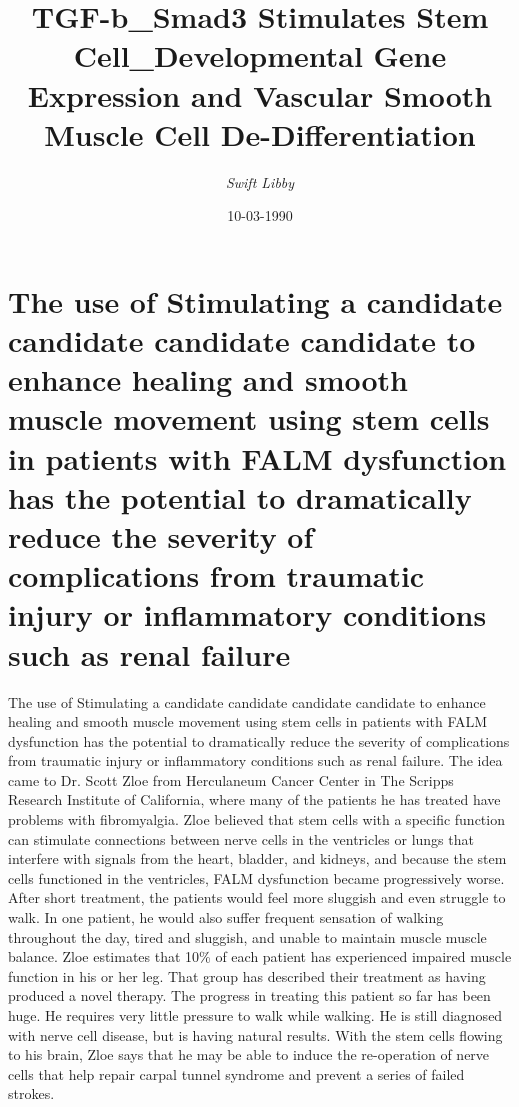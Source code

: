 \documentclass{article}%
\title{TGF{-}b\_Smad3 Stimulates Stem Cell\_Developmental Gene Expression and Vascular Smooth Muscle Cell De{-}Differentiation}%
\author{\textit{Swift Libby}}%
\date{10-03-1990}%
\begin{document}
%
\normalsize%
\maketitle%
\section{The use of Stimulating a candidate candidate candidate candidate to enhance healing and smooth muscle movement using stem cells in patients with FALM dysfunction has the potential to dramatically reduce the severity of complications from traumatic injury or inflammatory conditions such as renal failure}%
\label{sec:TheuseofStimulatingacandidatecandidatecandidatecandidatetoenhancehealingandsmoothmusclemovementusingstemcellsinpatientswithFALMdysfunctionhasthepotentialtodramaticallyreducetheseverityofcomplicationsfromtraumaticinjuryorinflammatoryconditionssuchasrenalfailure}%
The use of Stimulating a candidate candidate candidate candidate to enhance healing and smooth muscle movement using stem cells in patients with FALM dysfunction has the potential to dramatically reduce the severity of complications from traumatic injury or inflammatory conditions such as renal failure.\newline%
The idea came to Dr. Scott Zloe from Herculaneum Cancer Center in The Scripps Research Institute of California, where many of the patients he has treated have problems with fibromyalgia. Zloe believed that stem cells with a specific function can stimulate connections between nerve cells in the ventricles or lungs that interfere with signals from the heart, bladder, and kidneys, and because the stem cells functioned in the ventricles, FALM dysfunction became progressively worse. After short treatment, the patients would feel more sluggish and even struggle to walk. In one patient, he would also suffer frequent sensation of walking throughout the day, tired and sluggish, and unable to maintain muscle muscle balance. Zloe estimates that 10\% of each patient has experienced impaired muscle function in his or her leg. That group has described their treatment as having produced a novel therapy.\newline%
The progress in treating this patient so far has been huge. He requires very little pressure to walk while walking. He is still diagnosed with nerve cell disease, but is having natural results. With the stem cells flowing to his brain, Zloe says that he may be able to induce the re{-}operation of nerve cells that help repair carpal tunnel syndrome and prevent a series of failed strokes.\newline%
\end{document}
